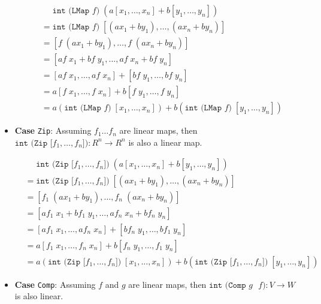 \begin{itemize}
\begin{align*}
  &\phantom{=} \texttt{int (LMap $f$)}\; (a[x_1,\dots,x_n] + b[y_1,\ldots,y_n]) \\
  &= \texttt{int (LMap $f$)}\; [(a x_1 + b y_1), \ldots, (a x_n + b y_n)] \\
  &= [\texttt{$f$}\; (a x_1 + b y_1), \ldots, \texttt{$f$}\; (a x_n + b y_n)] \\
  &= [a \texttt{$f$}\; x_1 + b \texttt{$f$} \; y_1, \ldots, a \texttt{$f$}\;  x_n + b \texttt{$f$}\; y_n] \\
  &= [a \texttt{$f$}\; x_1 ,\ldots, a \texttt{$f$}\; x_n ] +  [b \texttt{$f$}\; y_1 ,\ldots, b \texttt{$f$}\; y_n] \\
  &= a[\texttt{$f$}\; x_1 ,\ldots, \texttt{$f$}\; x_n ] + b [\texttt{$f$}\; y_1 ,\ldots, \texttt{$f$}\; y_n] \\
  &= a\left(\texttt{int (LMap $f$)}\;  [x_1 ,\ldots, x_n ]\right) + b \left( \texttt{int (LMap $f$)}\; [ y_1 ,\ldots, y_n]\right)
\end{align*}


\item{\textbf{Case} \texttt{Zip}:}
Assuming $f_1 \ldots f_n$ are linear maps, then \( \texttt{int (Zip [$f_1,\ldots,f_n$])} \colon R^n
\rightarrow R^n\) is also a linear map.


\begin{align*}
  &\phantom{=} \texttt{int (Zip [$f_1,\ldots,f_n$])}\; (a[x_1,\dots,x_n] + b[y_1,\ldots,y_n]) \\
  &= \texttt{int (Zip [$f_1,\ldots,f_n$])}\; [(a x_1 + b y_1), \ldots, (a x_n + b y_n)] \\
  &= [\texttt{$f_1$}\; (a x_1 + b y_1), \ldots, \texttt{$f_n$}\; (a x_n + b y_n)] \\
  &= [a \texttt{$f_1$}\; x_1 + b \texttt{$f_1$} \; y_1, \ldots, a \texttt{$f_n$}\;  x_n + b \texttt{$f_n$}\; y_n] \\
  &= [a \texttt{$f_1$}\; x_1 ,\ldots, a \texttt{$f_n$}\; x_n ] +  [b \texttt{$f_n$}\; y_1 ,\ldots, b \texttt{$f_1$}\; y_n] \\
  &= a[ \texttt{$f_1$}\; x_1 ,\ldots,  \texttt{$f_n$}\; x_n ] +  b[ \texttt{$f_n$}\; y_1 ,\ldots, \texttt{$f_1$}\; y_n] \\
  &= a \left(\texttt{int (Zip [$f_1,\ldots,f_n$])}\;  [x_1 ,\ldots, x_n ]\right) + b\left( \texttt{int (Zip [$f_1,\ldots,f_n$])}\; [ y_1 ,\ldots, y_n] \right)
\end{align*}


\item{\textbf{Case} \texttt{Comp}:}
Assuming $f$ and $g$ are linear maps, then
\( \texttt{int (Comp $g$ $f$)} \colon V \rightarrow W \) is also linear.



\end{itemize}
